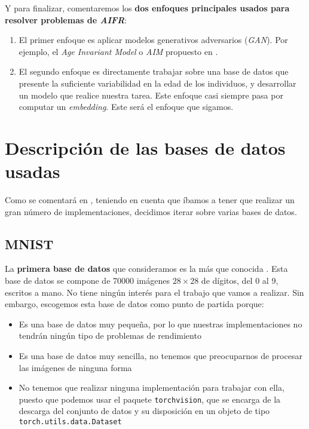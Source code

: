 Y para finalizar, comentaremos los \textbf{dos enfoques principales usados para resolver problemas de \textit{AIFR}}:

\begin{enumerate}
    \item El primer enfoque es aplicar modelos generativos adversarios (\textit{GAN}). Por ejemplo, el \textit{Age Invariant Model} o \textit{AIM} propuesto en \cite{informatica:tecnica_sintesis_aifr}.
    \item El segundo enfoque es directamente trabajar sobre una base de datos que presente la suficiente variabilidad en la edad de los individuos, y desarrollar un modelo que realice nuestra tarea. Este enfoque casi siempre pasa por computar un \textit{embedding}. Este será el enfoque que sigamos.
\end{enumerate}

\section{Descripción de las bases de datos usadas} \label{isec:base_datos_usada}

Como se comentará en , teniendo en cuenta que íbamos a tener que realizar un gran número de implementaciones, decidimos iterar sobre varias bases de datos.

\subsection{MNIST}

La \textbf{primera base de datos} que consideramos es la más que conocida  \cite{informatica:mnist}. Esta base de datos se compone de 70000 imágenes $28 \times 28$ de dígitos, del 0 al 9, escritos a mano. No tiene ningún interés para el trabajo que vamos a realizar. Sin embargo, escogemos esta base de datos como punto de partida porque:

\begin{itemize}
    \item Es una base de datos muy pequeña, por lo que nuestras implementaciones no tendrán ningún tipo de problemas de rendimiento
    \item Es una base de datos muy sencilla, no tenemos que preocuparnos de procesar las imágenes de ninguna forma
    \item No tenemos que realizar ninguna implementación para trabajar con ella, puesto que podemos usar el paquete \lstinline{torchvision}, que se encarga de la descarga del conjunto de datos y su disposición en un objeto de tipo \lstinline{torch.utils.data.Dataset}
\end{itemize}

